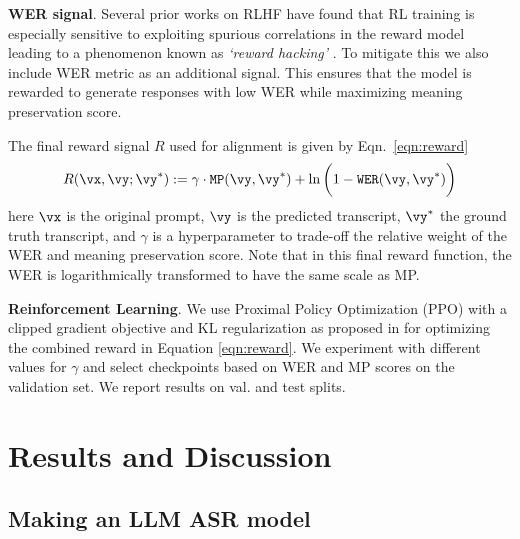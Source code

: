 \documentclass[conference]{IEEEtran}
\begin{document}
%
%
%

%

%

%
%

%
\textbf{WER signal}. Several prior works on RLHF have found that RL training is especially sensitive to exploiting spurious correlations in the reward model leading to a phenomenon known as \textit{`reward hacking'} \cite{eisenstein2023helping, gao2023scaling, pang2022reward, wang2024transforming}. To mitigate this we also include WER metric as an additional signal.
%
%
%
%
This ensures that the model is rewarded to generate responses with low WER while maximizing meaning preservation score. 

\noindent The final reward signal $R$ used for alignment is given by Eqn.~\ref{eqn:reward}
\begin{equation}
R(\vx, \vy; \vy^*) := \gamma \cdot \texttt{MP}(\vy, \vy^*) + \ln \bigg( 1 - \texttt{WER}(\vy, \vy^*) \bigg)
\label{eqn:reward}
\end{equation}
here $\vx$ is the original prompt, $\vy$ is the predicted transcript, $\vy^*$ the ground truth transcript, %
and $\gamma$ is a hyperparameter to trade-off the relative weight of the WER and meaning preservation score. Note that in this final reward function, the WER is logarithmically transformed to have the same scale as MP.

%

\textbf{Reinforcement Learning}. We use Proximal Policy Optimization (PPO) with a clipped gradient objective and  KL regularization as proposed in \cite{schulman2017proximal} for optimizing the combined reward in Equation \ref{eqn:reward}. We experiment with different values for $\gamma$ and select checkpoints based on WER and MP scores on the validation set. We report results on val. and test splits. %











%
%
%
%
%
%
%
%
%
%
%

\section{Results and Discussion}


%
%
%
%
%
%




\subsection{Making an LLM ASR model}
\end{document}
